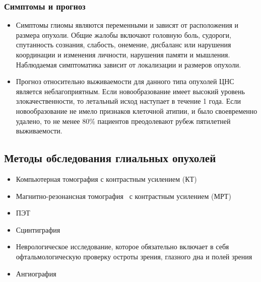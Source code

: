 \begin{frame}
  \frametitle{Симптомы и прогноз}
  \begin{itemize}
    \item Симптомы глиомы являются переменными и зависят от расположения и размера опухоли. 
    Общие жалобы включают головную боль, судороги, спутанность сознания, слабость, онемение, 
    дисбаланс или нарушения координации и изменения личности, нарушения памяти и мышления. 
    Наблюдаемая симптоматика зависит от локализации и размеров опухоли.

  \item Прогноз относительно выживаемости для данного типа опухолей ЦНС является неблагоприятным. 
  Если новообразование имеет высокий уровень злокачественности, то летальный исход наступает в 
  течение 1 года. Если новообразование не имело признаков клеточной атипии, и было 
  своевременно удалено, то не менее 80\% пациентов преодолевают рубеж пятилетней выживаемости.
  \end{itemize}
\end{frame}


\subsection{Методы обследования глиальных опухолей}

\begin{frame}
  \begin{itemize}
    \frametitle{Методы обследования глиальных опухолей}
    \item Компьютерная томография с контрастным усилением (КТ)
    \item Магнитно-резонансная томография  с контрастным усилением (МРТ)
    \item ПЭТ 
    \item Сцинтиграфия
    \item Неврологическое исследование, которое обязательно включает в себя офтальмологическую проверку остроты зрения, глазного дна и полей зрения
    \item Ангиография
  \end{itemize}
\end{frame}